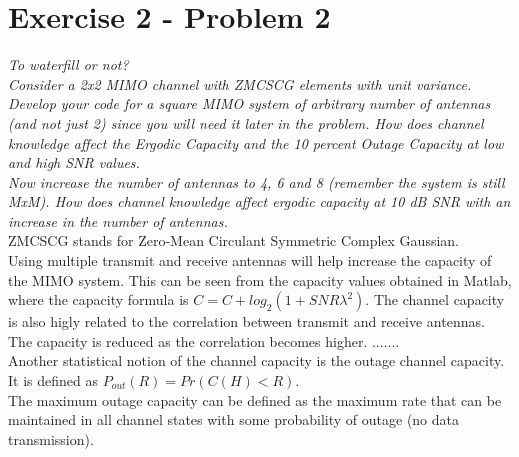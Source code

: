 \section{Exercise 2 - Problem 2}
\textit{To waterfill or not?}\\

\textit{Consider a 2x2 MIMO channel with ZMCSCG elements with unit variance. Develop your code for a square MIMO system of arbitrary number of antennas (and not just 2) since you will need it later in the problem. How does channel knowledge affect the Ergodic Capacity and the 10 percent Outage Capacity at low and high SNR values.} \\

\textit{Now increase the number of antennas to 4, 6 and 8 (remember the system is still MxM). How does channel knowledge affect ergodic capacity at 10 dB SNR with an increase in the number of antennas.}\\

ZMCSCG stands for Zero-Mean Circulant Symmetric Complex Gaussian. \\

Using multiple transmit and receive antennas will help increase the capacity of the MIMO system. This can be seen from the capacity values obtained in Matlab, where the capacity formula is $C=C+log_{2}(1+SNR \lambda ^{2})$. The channel capacity is also higly related to the correlation between transmit and receive antennas. The capacity is reduced as the correlation becomes higher. .......\\

Another statistical notion of the channel capacity is the outage channel capacity. It is defined as $P_{out}(R)=Pr(C(H)<R)$. \\

The maximum outage capacity can be defined as the maximum rate that can be maintained in all channel states with some probability of outage (no data transmission).

